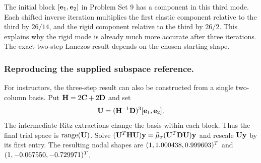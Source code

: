 \documentclass[12pt]{article}
\begin{document}
The initial block $[\mathbf{e}_1,\mathbf{e}_2]$ in Problem Set 9 has a component
in this third mode. Each shifted inverse iteration multiplies the first
elastic component relative to the third by $26/14$, and the rigid
component relative to the third by $26/2$. This explains why the rigid
mode is already much more accurate after three iterations. The exact
two-step Lanczos result depends on the chosen starting shape.

\subsubsection*{Reproducing the supplied subspace reference.}
For instructors, the three-step result can also be constructed from a single
two-column basis. Put $\mathbf{H}=2\mathbf{C}+2\mathbf{D}$ and set
\[
  \mathbf{U}=(\mathbf{H}^{-1}\mathbf{D})^3[\mathbf{e}_1,\mathbf{e}_2].
\]
The intermediate Ritz extractions change the basis within each block.
Thus the final trial space is $\operatorname{range}(\mathbf{U})$. Solve
$(\mathbf{U}^{T}\mathbf{H}\mathbf{U})\mathbf{y}
  =\widehat\mu_\sigma(\mathbf{U}^{T}\mathbf{D}\mathbf{U})\mathbf{y}$ and rescale
$\mathbf{U}\mathbf{y}$ by its first entry. The resulting nodal shapes are
$(1,1.000438,0.999603)^{T}$ and $(1,-0.067550,-0.729971)^{T}$.
\newpage
\end{document}
